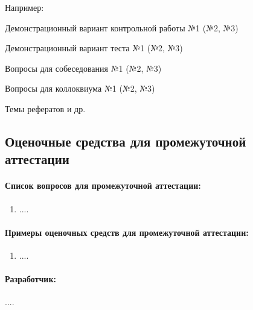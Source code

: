 \documentclass[12pt]{scrartcl}
\newcommand{\rdf}[2]{#2}
\newenvironment{rdfctx}[1]{}{}
\begin{document}
\noindent Например:

\noindent Демонстрационный вариант контрольной работы №1 (№2, №3)

\noindent Демонстрационный вариант теста №1 (№2, №3)

\noindent Вопросы для собеседования №1 (№2, №3)

\noindent Вопросы для коллоквиума №1 (№2, №3)

\noindent Темы рефератов и др.

\subsection{Оценочные средства для промежуточной аттестации}

\paragraph{Список вопросов для промежуточной аттестации:}
\begin{rdfctx}{\rdfsetctx{list}{syll wpdd:itemList !wpdd:QuestionList !wpdd:ItemList}}
\begin{enumerate}
\item \rdf{list ^schema:member !wpdd:ListItem !wpdd:Question}{....}
\end{enumerate}
\end{rdfctx}
\paragraph{Примеры оценочных средств для промежуточной аттестации:}
\begin{rdfctx}{\rdfsetctx{list}{syll wpdd:itemList !wpdd:ExampleList !wpdd:IntermediateAttestation !wpdd:ItemList}}
\begin{enumerate}
\item \rdf{list ^schema:member !wpdd:ListItem !wpdd:Example}{....}
\end{enumerate}
\end{rdfctx}
\paragraph{\normalfont Разработчик:}%
\rdf{syll wpdd:courseDC schema:author {foaf:name rdf:label} !foaf:Person }{....} %
\end{document}
